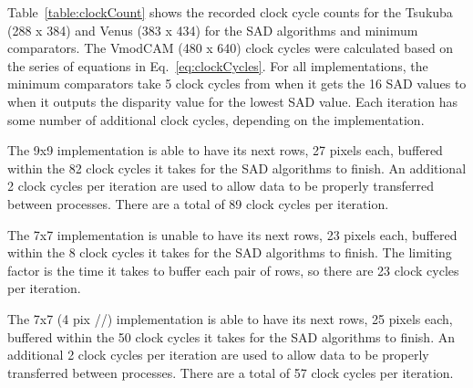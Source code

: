 Table~\ref{table:clockCount} shows the recorded clock cycle counts for the Tsukuba (288 x 384) and Venus (383 x 434) for the SAD algorithms and minimum comparators. The VmodCAM (480 x 640) clock cycles were calculated based on the series of equations in Eq.~\ref{eq:clockCycles}. For all implementations, the minimum comparators take 5 clock cycles from when it gets the 16 SAD values to when it outputs the disparity value for the lowest SAD value. Each iteration has some number of additional clock cycles, depending on the implementation.

The 9x9 implementation is able to have its next rows, 27 pixels each, buffered within the 82 clock cycles it takes for the SAD algorithms to finish. An additional 2 clock cycles per iteration are used to allow data to be properly transferred between processes. There are a total of 89 clock cycles per iteration.

The 7x7 implementation is unable to have its next rows, 23 pixels each, buffered within the 8 clock cycles it takes for the SAD algorithms to finish. The limiting factor is the time it takes to buffer each pair of rows, so there are 23 clock cycles per iteration.

The 7x7 (4 pix //) implementation is able to have its next rows, 25 pixels each, buffered within the 50 clock cycles it takes for the SAD algorithms to finish. An additional 2 clock cycles per iteration are used to allow data to be properly transferred between processes. There are a total of 57 clock cycles per iteration.

